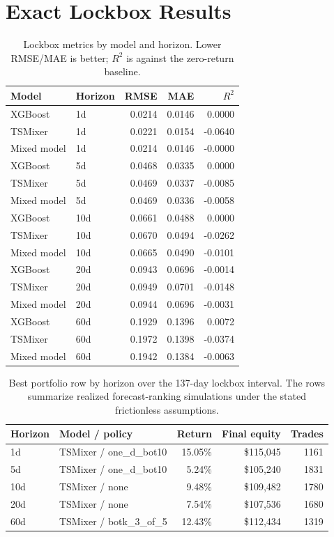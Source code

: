 \documentclass[sigconf,nonacm]{acmart}
\begin{document}
\section{Exact Lockbox Results}
\begin{table}[H]
\centering
\small
\caption{Lockbox metrics by model and horizon. Lower RMSE/MAE is better; $R^2$ is against the zero-return baseline.}
\begin{tabular}{@{}llrrr@{}}
\toprule
Model & Horizon & RMSE & MAE & $R^2$ \\
\midrule
XGBoost & 1d & 0.0214 & 0.0146 & 0.0000 \\
TSMixer & 1d & 0.0221 & 0.0154 & -0.0640 \\
Mixed model & 1d & 0.0214 & 0.0146 & -0.0000 \\
XGBoost & 5d & 0.0468 & 0.0335 & 0.0000 \\
TSMixer & 5d & 0.0469 & 0.0337 & -0.0085 \\
Mixed model & 5d & 0.0469 & 0.0336 & -0.0058 \\
XGBoost & 10d & 0.0661 & 0.0488 & 0.0000 \\
TSMixer & 10d & 0.0670 & 0.0494 & -0.0262 \\
Mixed model & 10d & 0.0665 & 0.0490 & -0.0101 \\
XGBoost & 20d & 0.0943 & 0.0696 & -0.0014 \\
TSMixer & 20d & 0.0949 & 0.0701 & -0.0148 \\
Mixed model & 20d & 0.0944 & 0.0696 & -0.0031 \\
XGBoost & 60d & 0.1929 & 0.1396 & 0.0072 \\
TSMixer & 60d & 0.1972 & 0.1398 & -0.0374 \\
Mixed model & 60d & 0.1942 & 0.1384 & -0.0063 \\
\bottomrule
\end{tabular}
\label{tab:lockbox_horizon_results}
\end{table}

\begin{table}[H]
\centering
\small
\caption{Best portfolio row by horizon over the 137-day lockbox interval. The rows summarize realized forecast-ranking simulations under the stated frictionless assumptions.}
\begin{tabular}{@{}llrrr@{}}
\toprule
Horizon & Model / policy & Return & Final equity & Trades \\
\midrule
1d & TSMixer / one\_d\_bot10 & 15.05\% & \$115,045 & 1161 \\
5d & TSMixer / one\_d\_bot10 & 5.24\% & \$105,240 & 1831 \\
10d & TSMixer / none & 9.48\% & \$109,482 & 1780 \\
20d & TSMixer / none & 7.54\% & \$107,536 & 1680 \\
60d & TSMixer / botk\_3\_of\_5 & 12.43\% & \$112,434 & 1319 \\
\bottomrule
\end{tabular}
\label{tab:portfolio_horizon_results}
\end{table}
\end{document}
